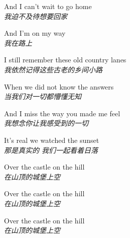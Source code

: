 \begin{spacing}{1.5}
\begin{flushleft}
And I can't wait to go home\\
\textit{我迫不及待想要回家}\lyricspace

And I'm on my way\\
\textit{我在路上}\lyricspace

I still remember these old country lanes\\
\textit{我依然记得这些古老的乡间小路}\lyricspace

When we did not know the answers\\
\textit{当我们对一切都懵懂无知}\lyricspace

And I miss the way you made me feel\\
\textit{我想念你让我感受到的一切}\lyricspace

It's real we watched the sunset\\
\textit{那是真实的 我们一起看着日落}\lyricspace

Over the castle on the hill\\
\textit{在山顶的城堡上空}\lyricspace

Over the castle on the hill\\
\textit{在山顶的城堡上空}\lyricspace

Over the castle on the hill\\
\textit{在山顶的城堡上空}\lyricspace
\end{flushleft}
\end{spacing}
